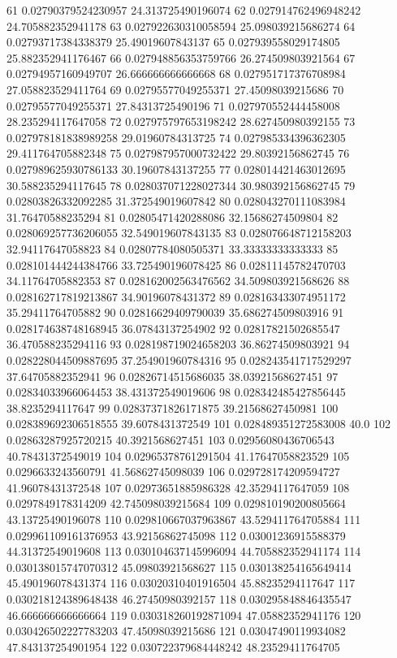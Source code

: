 {61 0.02790379524230957 24.313725490196074
62 0.027914762496948242 24.705882352941178
63 0.027922630310058594 25.098039215686274
64 0.02793717384338379 25.49019607843137
65 0.027939558029174805 25.882352941176467
66 0.027948856353759766 26.274509803921564
67 0.02794957160949707 26.666666666666668
68 0.027951717376708984 27.058823529411764
69 0.02795577049255371 27.45098039215686
70 0.02795577049255371 27.84313725490196
71 0.027970552444458008 28.235294117647058
72 0.027975797653198242 28.627450980392155
73 0.027978181838989258 29.01960784313725
74 0.027985334396362305 29.411764705882348
75 0.027987957000732422 29.80392156862745
76 0.027989625930786133 30.19607843137255
77 0.028014421463012695 30.588235294117645
78 0.028037071228027344 30.980392156862745
79 0.02803826332092285 31.372549019607842
80 0.028043270111083984 31.76470588235294
81 0.02805471420288086 32.15686274509804
82 0.028069257736206055 32.549019607843135
83 0.028076648712158203 32.94117647058823
84 0.02807784080505371 33.33333333333333
85 0.028101444244384766 33.725490196078425
86 0.02811145782470703 34.11764705882353
87 0.028162002563476562 34.509803921568626
88 0.028162717819213867 34.90196078431372
89 0.028163433074951172 35.29411764705882
90 0.02816629409790039 35.686274509803916
91 0.028174638748168945 36.07843137254902
92 0.02817821502685547 36.470588235294116
93 0.028198719024658203 36.86274509803921
94 0.028228044509887695 37.254901960784316
95 0.028243541717529297 37.64705882352941
96 0.02826714515686035 38.03921568627451
97 0.02834033966064453 38.431372549019606
98 0.028342485427856445 38.8235294117647
99 0.02837371826171875 39.21568627450981
100 0.028389692306518555 39.6078431372549
101 0.028489351272583008 40.0
102 0.02863287925720215 40.3921568627451
103 0.02956080436706543 40.78431372549019
104 0.02965378761291504 41.17647058823529
105 0.0296633243560791 41.56862745098039
106 0.029728174209594727 41.96078431372548
107 0.02973651885986328 42.35294117647059
108 0.0297849178314209 42.745098039215684
109 0.029810190200805664 43.13725490196078
110 0.029810667037963867 43.529411764705884
111 0.029961109161376953 43.92156862745098
112 0.03001236915588379 44.31372549019608
113 0.030104637145996094 44.705882352941174
114 0.030138015747070312 45.09803921568627
115 0.030138254165649414 45.490196078431374
116 0.03020310401916504 45.88235294117647
117 0.030218124389648438 46.27450980392157
118 0.030295848846435547 46.666666666666664
119 0.030318260192871094 47.05882352941176
120 0.030426502227783203 47.45098039215686
121 0.03047490119934082 47.843137254901954
122 0.030722379684448242 48.23529411764705
}
